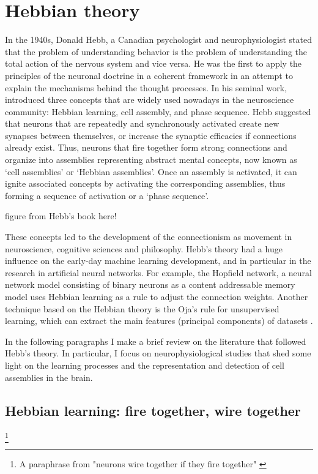 \section{Hebbian theory}

  In the 1940s, Donald Hebb, a Canadian psychologist and neurophysiologist
  stated that the problem of understanding behavior is the problem of
  understanding the total action of the nervous system and vice versa. He was
  the first to apply the principles of the neuronal doctrine \cite{Cajal1894}
  in a coherent framework in an attempt to explain the mechanisms behind the
  thought processes. In his seminal work, \cite{Hebb49} introduced three
  concepts that are widely used nowadays in the neuroscience community: Hebbian
  learning, cell assembly, and phase sequence. Hebb suggested that neurons that
  are repeatedly and synchronously activated create new synapses between
  themselves, or increase the synaptic efficacies if connections already exist.
  Thus, neurons that fire together form strong connections and organize into
  assemblies representing abstract mental concepts, now known as `cell
  assemblies' or `Hebbian assemblies'. Once an assembly is activated, it can
  ignite associated concepts by activating the corresponding assemblies, thus
  forming a sequence of activation or a `phase sequence'.
   
  figure from Hebb's book here!

  These concepts led to the development of the connectionism as movement in
  neuroscience, cognitive sciences and philosophy. Hebb's theory had a huge
  influence on the early-day machine learning development, and in particular in
  the research in artificial neural networks. For example, the Hopfield
  network, a neural network model consisting of binary neurons as a content
  addressable memory model \citep{Hopfield1982} uses Hebbian learning as a rule
  to adjust the connection weights. Another technique based on the Hebbian
  theory is the Oja's rule for unsupervised learning, which can extract the
  main features (principal components) of datasets \citep{Oja1982}.

  In the following paragraphs I make a brief review on the literature that
  followed Hebb's theory. In particular, I focus on neurophysiological studies
  that shed some light on the learning processes and the representation and
  detection of cell assemblies in the brain.
  
  \subsection{Hebbian learning: fire together, wire together} \footnote{A
    paraphrase from "neurons wire together if they fire together" \citep{Lowel1992}}

